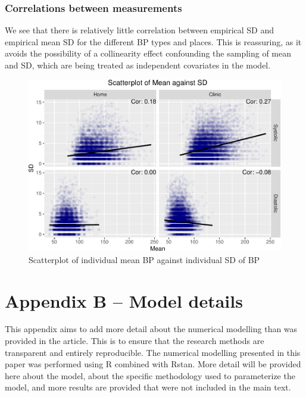 \documentclass[
]{article}
\begin{document}
\hypertarget{sec:correlations}{%
\subsubsection{Correlations between measurements}\label{sec:correlations}}

We see that there is relatively little correlation between empirical SD and empirical mean SD for the different BP types and places. This is reassuring, as it avoids the possibility of a collinearity effect confounding the sampling of mean and SD, which are being treated as independent covariates in the model.

\begin{figure}
\centering
\includegraphics{Appendix_files/figure-latex/SD-mean-1.pdf}
\caption{\label{fig:SD-mean}Scatterplot of individual mean BP against individual SD of BP}
\end{figure}

\hypertarget{appendix-b-model-details}{%
\section{Appendix B -- Model details}\label{appendix-b-model-details}}

This appendix aims to add more detail about the numerical modelling than was provided in the article. This is to ensure that the research methods are transparent and entirely reproducible. The numerical modelling presented in this paper was performed using R combined with Rstan. More detail will be provided here about the model, about the specific methodology used to parameterize the model, and more results are provided that were not included in the main text.
\end{document}
